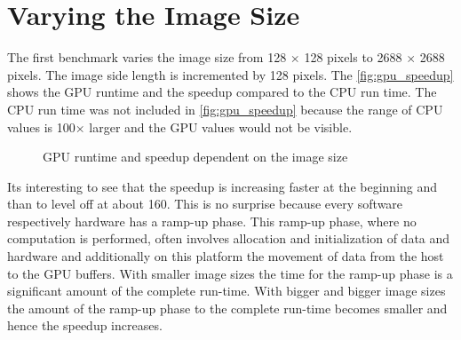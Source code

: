 \section{Varying the Image Size} %
\label{sec:varying_the_image_size}
The first benchmark varies the image size from 128 $\times$ 128 pixels to 2688
$\times$ 2688 pixels. The image side length is incremented by 128 pixels. The
\autoref{fig:gpu_speedup} shows the \gls{GPU} runtime and the speedup compared
to the \gls{CPU} run time. The \gls{CPU} run time was not included in
\autoref{fig:gpu_speedup} because the range of \gls{CPU} values is 100$\times$ 
larger and the \gls{GPU} values would not be visible. 
\begin{figure}[ht]
	\centering
		\caption{\protect\gls{GPU} runtime and speedup dependent on the image size}%
		\label{fig:gpu_speedup}%
	\end{figure}
Its interesting to see that the speedup is increasing faster at the beginning
and than to level off at about 160. This is no surprise because every software
respectively hardware has a ramp-up phase. This ramp-up phase, where no
computation is performed, often involves allocation and initialization of data
and hardware and additionally on this platform the movement of data from the
host to the \gls{GPU} buffers. With smaller image sizes the time for the ramp-up
phase is a significant amount of the complete run-time. With bigger and bigger
image sizes the amount of the ramp-up phase to the complete run-time becomes 
smaller and hence the speedup increases. 

